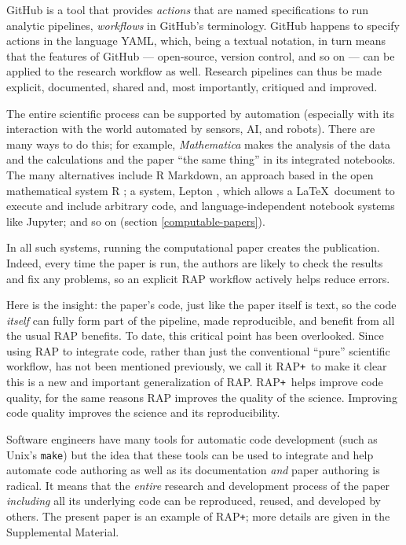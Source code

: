 \documentclass{comjnl}
\def\supplement{Supplemental Material}
\def\RAPstar{RAP{\tt +}}
\def\RAPstarp#1{RAP{\tt +}#1}
\begin{document}
GitHub is a tool that provides \emph{actions\/} that are named specifications to run analytic pipelines, \emph{workflows\/} in GitHub's terminology. GitHub happens to specify actions in the language YAML, which, being a textual notation, in turn means that the features of GitHub --- open-source, version control, and so on --- can be applied to the research workflow as well. Research pipelines can thus be made explicit, documented, shared and, most importantly, critiqued and improved.

The entire scientific process can be supported by automation (especially with its interaction with the world automated by sensors, AI, and robots). There are many ways to do this; for example, \emph{Mathematica\/} makes the analysis of the data and the calculations and the paper ``the same thing'' in its integrated notebooks. The many alternatives include R Markdown, an approach based in the open mathematical system R \cite{RMarkdown}; a system, Lepton \cite{lepton}, which allows a \LaTeX\ document to execute and include arbitrary code, and language-independent notebook systems like Jupyter; and so on (section \ref{computable-papers}).  

In all such systems, running the computational paper creates the publication. Indeed, every time the paper is run, the authors are likely to check the results and fix any problems, so an explicit RAP workflow actively helps reduce errors. 

Here is the insight: the paper's code, just like the paper itself is text, so the code \emph{itself\/} can fully form part of the pipeline, made reproducible, and benefit from all the usual RAP benefits. To date, this critical point has been overlooked. Since using RAP to integrate code, rather than just the conventional ``pure'' scientific workflow, has not been mentioned previously, we call it \RAPstar\ to make it clear this is a new and important generalization of RAP\@. \RAPstar\ helps improve code quality, for the same reasons RAP improves the quality of the science. Improving code quality improves the science and its reproducibility. 

Software engineers have many tools for automatic code development (such as Unix's \texttt{make}) but the idea that these tools can be used to integrate and help automate code authoring as well as its documentation \emph{and\/} paper authoring is radical. It means that the \emph{entire\/} research and development process of the paper \emph{including\/} all its underlying code can be reproduced, reused, and developed by others. The present paper is an example of \RAPstarp; more details are given in the \supplement. 
\end{document}
